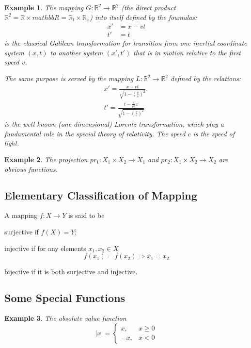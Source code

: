\documentclass[a4paper,12pt]{article} %
\newtheorem{example}{Example}[section]
\begin{document}
\begin{example}
    The mapping $G: \mathbb{R}^2 \rightarrow \mathbb{R}^2$ (the direct product 
    $\displaystyle \mathbb{R}^2 = \mathbb{R} \times mathbb{R} = \mathbb{R}_t 
    \times \mathbb{R}_x$) into itself defined by the foumulas:
    \[
    \begin{array}{ll}
        x' & = x - vt \\
        t' & = t
    \end{array}
    \]
   is the classical Galilean transformation for transition from 
    one inertial coordinate system $(x,t)$ to another system $(x', t')$
    that is in motion relative to the first speed $v$.

    The same purpose is served by the mapping $L: \mathbb{R}^2 
    \to \mathbb{R}^2$ defined by the relations:
    \[
    \begin{array}{ll}
        x' = \frac{x - vt}{\sqrt{1 - \left(\frac{v}{c}\right)^2}},\\
        t' = \frac{t - \frac{v}{c^2}x}{\sqrt{1-\left(\frac{v}{c}\right)^2}}
     \end{array}
     \]
     is the well known (one-dimensional) Lorentz transformation,
     which play a fundamental role in the special theory of
     relativity. The speed $c$ is the speed of light.
\end{example}

\begin{example}
    The projection $pr_1: X_1 \times X_2 \to X_1$ and $pr_2: X_1 \times X_2 \to X_2$
    are obvious functions.
\end{example}

\subsection{Elementary Classification of Mapping}
A mapping $f: X \to Y$ is said to be 

{\color{red} surjective} if $f(X) = Y$;

{\color{red} injective} if for any elements $x_1, x_2 \in X$
\[
    f(x_1) = f(x_2) \Rightarrow x_1 = x_2
    \]

{\color{red} bijective} if it is both surjective and injective.

\subsection{Some Special Functions}
\begin{example}{The absolute value function}
    \[
        \left|x\right| = \left\{ \begin{array} {cc}
                          x, & x \ge 0 \\
                         -x, & x < 0
        \end{array}\right.
        \]
\end{example}
\end{document}

